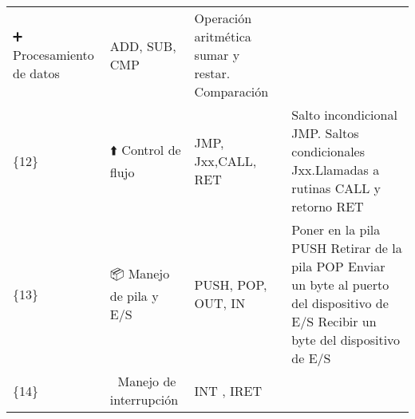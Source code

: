 \documentclass[12pt,twoside]{templates/unerthesis}
\begin{document}
\begin{longtable}[]{@{}llll@{}}
\begin{minipage}[t]{0.11\columnwidth}
➕ Procesamiento de datos\strut
\end{minipage} & \begin{minipage}[t]{0.08\columnwidth}\raggedright
ADD, SUB, CMP\strut
\end{minipage} & \begin{minipage}[t]{0.56\columnwidth}\raggedright
Operación aritmética sumar y restar. Comparación\strut
\end{minipage}\tabularnewline
\begin{minipage}[t]{0.14\columnwidth}\raggedright
\{12\}\strut
\end{minipage} & \begin{minipage}[t]{0.11\columnwidth}\raggedright
⬆️ Control de flujo\strut
\end{minipage} & \begin{minipage}[t]{0.08\columnwidth}\raggedright
JMP, Jxx,CALL, RET\strut
\end{minipage} & \begin{minipage}[t]{0.56\columnwidth}\raggedright
Salto incondicional JMP. Saltos condicionales Jxx.Llamadas a rutinas CALL y retorno RET\strut
\end{minipage}\tabularnewline
\begin{minipage}[t]{0.14\columnwidth}\raggedright
\{13\}\strut
\end{minipage} & \begin{minipage}[t]{0.11\columnwidth}\raggedright
📦 Manejo de pila y E/S\strut
\end{minipage} & \begin{minipage}[t]{0.08\columnwidth}\raggedright
PUSH, POP, OUT, IN\strut
\end{minipage} & \begin{minipage}[t]{0.56\columnwidth}\raggedright
Poner en la pila PUSH Retirar de la pila POP Enviar un byte al puerto del dispositivo de E/S Recibir un byte del dispositivo de E/S\strut
\end{minipage}\tabularnewline
\begin{minipage}[t]{0.14\columnwidth}\raggedright
\{14\}\strut
\end{minipage} & \begin{minipage}[t]{0.11\columnwidth}\raggedright
🚨 Manejo de interrupción\strut
\end{minipage} & \begin{minipage}[t]{0.08\columnwidth}\raggedright
INT , IRET\strut
\end{minipage} & \begin{minipage}[t]{0.56\columnwidth}\raggedright

\end{minipage}
\end{longtable}
\end{document}
